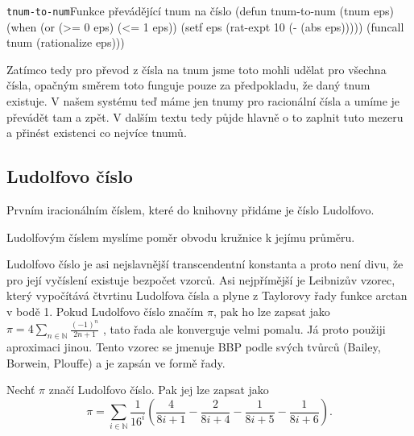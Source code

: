 \begin{lispcode}{\texttt{tnum-to-num}}{Funkce převádějící tnum na číslo}
(\textcolor{funkcionalni}{defun} \textcolor{pojmenovan}{tnum-to-num} (tnum eps)
  (\textcolor{funkcionalni}{when} (\textcolor{funkcionalni}{or} (\textcolor{matematicke}{>=} 0 eps) (\textcolor{matematicke}{<=} 1 eps))
    (\textcolor{vedlejsi}{setf} eps (\textcolor{moje}{rat-expt} 10 (\textcolor{matematicke}{-} (\textcolor{matematicke}{abs} eps)))))
  (\textcolor{funkcionalni}{funcall} tnum (\textcolor{matematicke}{rationalize} eps)))
\end{lispcode}

Zatímco tedy pro převod z čísla na tnum jsme toto mohli udělat pro všechna čísla, opačným směrem toto funguje pouze za předpokladu, že daný tnum existuje. V našem systému teď máme jen tnumy pro racionální čísla a umíme je převádět tam a zpět. V dalším textu tedy půjde hlavně o to zaplnit tuto mezeru a přinést existenci co nejvíce tnumů.

\subsection{Ludolfovo číslo}
Prvním iracionálním číslem, které do knihovny přidáme je číslo Ludolfovo.

\begin{definition}
Ludolfovým číslem myslíme poměr obvodu kružnice k jejímu průměru.
\end{definition}

Ludolfovo číslo je asi nejslavnější transcendentní konstanta a proto není divu, že pro její vyčíslení existuje bezpočet vzorců. Asi nejpřímější je Leibnizův vzorec, který vypočítává čtvrtinu Ludolfova čísla a plyne z Taylorovy řady funkce arctan v bodě 1. Pokud Ludolfovo číslo značím $\pi$, pak ho lze zapsat jako $\pi=4\sum_{n\in\mathbb{N}}\frac{(-1)^n}{2n+1}$ \cite{approxpi}, tato řada ale konverguje velmi pomalu. Já proto použiji aproximaci jinou. Tento vzorec se jmenuje BBP podle svých tvůrců (Bailey, Borwein, Plouffe) a je zapsán ve formě řady.

\begin{fact}
Nechť $\pi$ značí Ludolfovo číslo. Pak jej lze zapsat jako
\begin{equation}
\pi=\sum_{i\in\mathbb{N}}\frac{1}{16^i}\left(\frac{4}{8i+1}-\frac{2}{8i+4}-\frac{1}{8i+5}-\frac{1}{8i+6}\right).
\end{equation}
\end{fact}

